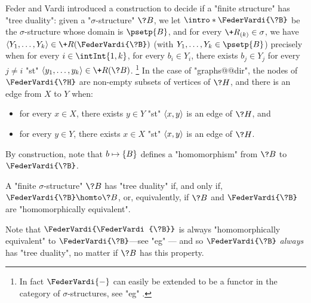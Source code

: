 Feder and Vardi introduced a construction to decide if a "finite structure" has "tree duality":
given a "$\sigma$-structure" $\?B$, we let \AP$\intro*\FederVardi{\?B}$ be
the $\sigma$-structure whose domain is $\psetp{B}$, and for every $\+R_{(k)} \in \sigma$,
we have $\tup{Y_1, \dotsc, Y_k} \in \+R(\FederVardi{\?B})$ 
(with $Y_1, \dotsc, Y_k \in \psetp{B}$) precisely when 
for every $i\in \intInt{1,k}$, 
for every $b_i \in Y_i$,
there exists $b_j \in Y_j$ for every $j \neq i$ "st" 
$\tup{y_1, \dotsc, y_k} \in \+R(\?B)$.%
\footnote{In fact $\FederVardi{-}$ can
easily be extended to be a functor in the category of $\sigma$-structures, see
"eg" \cite[\S~9.2.2]{NesetrilPOM2012FirstOrderCSPs}.}
In the case of "graphs@@dir", the nodes of $\FederVardi{\?H}$ are non-empty
subsets of vertices of $\?H$, and there is an edge from $X$ to $Y$ when:
\begin{itemize}
	\item for every $x \in X$, there exists $y\in Y$ "st" $\langle x,y\rangle$ is an edge of $\?H$, and
	\item for every $y\in Y$, there exists $x\in X$ "st" $\langle x,y\rangle$ is an edge of $\?H$.
\end{itemize}

By construction, note that $b \mapsto \{B\}$ defines a "homomorphism" from
$\?B$ to $\FederVardi{\?B}$.

\begin{proposition}
	\label{prop:charac-Feder-Vardi}
	A "finite $\sigma$-structure" $\?B$ has "tree duality" if, and only if,
	$\FederVardi{\?B} \homto \?B$, or, equivalently, if $\?B$ and $\FederVardi{\?B}$
	are "homomorphically equivalent".
\end{proposition}

Note that $\FederVardi{\FederVardi{\?B}}$ is always "homomorphically equivalent" to
$\FederVardi{\?B}$---see "eg" \cite[\S~9.2.2, Proposition 9.1]{NesetrilPOM2012FirstOrderCSPs}---
and so $\FederVardi{\?B}$ \emph{always} has "tree duality", no matter if $\?B$ has this property.

